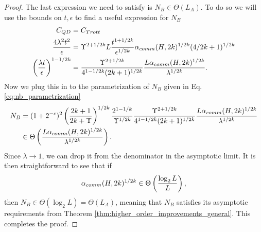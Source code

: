 \begin{proof}
The last expression we need to satisfy is $N_B \in \Theta(L_A)$. To do so we will use the bounds on $t,\epsilon$ to find a useful expression for $N_B$
\begin{align}
    C_{QD} &= C_{Trott} \\
    \frac{4 \lambda^2 t^2}{\epsilon} &= \Upsilon^{2 + 1/2k} L \frac{t^{1 + 1/2k}}{\epsilon^{1/2k}} \alpha_{comm}(H,2k)^{1/2k} (4/2k+1)^{1/2k} \\
    \left( \frac{\lambda t}{\epsilon} \right)^{1-1/2k} &= \frac{\Upsilon^{2+1/2k}}{4^{1-1/2k} (2k+1)^{1/2k}} \frac{L \alpha_{comm}(H,2k)^{1/2k}}{\lambda^{1/2k}}.
\end{align}
Now we plug this in to the parametrization of $N_B$ given in Eq. \eqref{eq:nb_parametrization}
\begin{align}
    N_B &= (1 + 2^{-c})^{2} \left( \frac{2k+1}{2k + \Upsilon} \right)^{1/2k} \frac{2^{1-1/k}}{\Upsilon^{1/2k}} \frac{\Upsilon^{2+1/2k}}{4^{1-1/2k} (2k+1)^{1/2k}} \frac{L \alpha_{comm}(H,2k)^{1/2k}}{\lambda^{1/2k}} \\
    &\in \Theta \left( \frac{L \alpha_{comm}(H,2k)^{1/2k}}{\lambda^{1/2k}} \right).
\end{align}
Since $\lambda \to 1$, we can drop it from the denominator in the asymptotic limit. It is then straightforward to see that if $$\alpha_{comm}(H,2k)^{1/2k} \in \Theta\left( \frac{\log_2 L}{L} \right),$$ then $N_B \in \Theta(\log_2 L) = \Theta(L_A)$, meaning that $N_B$ satisfies its asymptotic requirements from Theorem \ref{thm:higher_order_improvements_general}. This completes the proof.
\end{proof}




